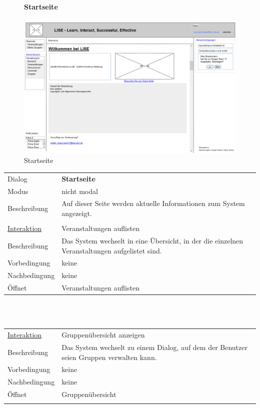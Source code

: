 \documentclass[12pt,a4paper]{article}
\begin{document}
{\begin{figure}[H]
	\paragraph{Startseite}
	\includegraphics[width=\textwidth]{Bilder/Mockups/GUI/Startseite.png}
	\caption{Startseite}
	\label{GuiStartseite}
\end{figure}

\begin{tabular}{l p{12cm}}
Dialog 	 & \textbf{Startseite} \\ 
Modus & nicht modal\\ 
Beschreibung   	 & Auf dieser Seite werden aktuelle Informationen zum System angezeigt.\\\\

\underline{Interaktion} 	 & Veranstaltungen auflisten\\ 
Beschreibung   	 & Das System wechselt in eine Übersicht, in der die einzelnen Veranstaltungen aufgelistet sind.\\
Vorbedingung	& keine \\
Nachbedingung	& keine \\
Öffnet			& \glqq Veranstaltungen auflisten\grqq \\
\end{tabular}\\\\

\begin{tabular}{l p{12cm}}
\underline{Interaktion} 	 & Gruppenübersicht anzeigen\\ 
Beschreibung   	 & Das System wechselt zu einem Dialog, auf dem der Benutzer seien Gruppen verwalten kann.\\
Vorbedingung	& keine \\
Nachbedingung	& keine \\
Öffnet			& \glqq Gruppenübersicht\grqq \\\\
\end{tabular}\\\\

}
\end{document}
